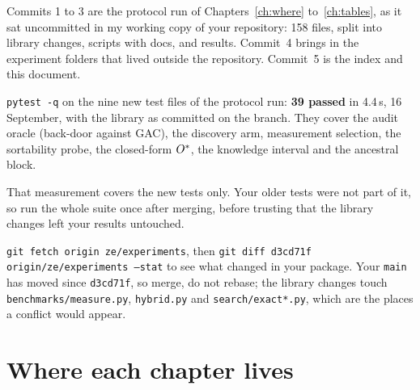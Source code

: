 Commits 1 to 3 are the protocol run of Chapters~\ref{ch:where} to~\ref{ch:tables}, as it sat
uncommitted in my working copy of your repository: 158 files, split into library changes, scripts
with docs, and results. Commit~4 brings in the experiment folders that lived outside the repository.
Commit~5 is the index and this document.

\begin{medido}
\texttt{pytest -q} on the nine new test files of the protocol run: \textbf{39 passed} in 4.4\,s,
16 September, with the library as committed on the branch. They cover the audit oracle (back-door
against GAC), the discovery arm, measurement selection, the sortability probe, the closed-form
$O^{*}$, the knowledge interval and the ancestral block.
\end{medido}

That measurement covers the new tests only. Your older tests were not part of it, so run the whole
suite once after merging, before trusting that the library changes left your results untouched.

\begin{noprato}[Getting it]
\texttt{git fetch origin ze/\allowbreak{}experiments}, then \texttt{git diff d3cd71f origin/\allowbreak{}ze/\allowbreak{}experiments --stat}
to see what changed in your package. Your \texttt{main} has moved since \texttt{d3cd71f}, so merge,
do not rebase; the library changes touch \texttt{benchmarks/measure.py}, \texttt{hybrid.py} and
\texttt{search/exact*.py}, which are the places a conflict would appear.
\end{noprato}


\section{Where each chapter lives}

\begin{antes}
\end{antes}

